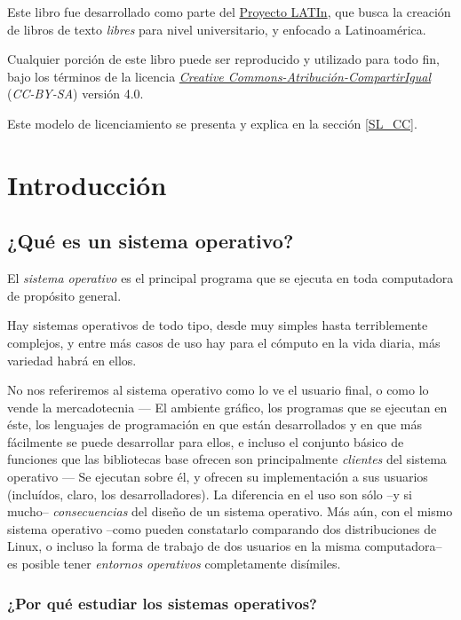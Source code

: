 \documentclass[11pt,fleqn]{book} %
\begin{document}
Este libro fue desarrollado como parte del \href{http://www.latinproject.org/}{Proyecto LATIn}, que busca
la creación de libros de texto \emph{libres} para nivel universitario, y
enfocado a Latinoamérica.

Cualquier porción de este libro puede ser reproducido y utilizado para
todo fin, bajo los términos de la licencia \emph{\href{https://creativecommons.org/licenses/by-sa/4.0/deed.es}{Creative Commons-Atribución-CompartirIgual}} (\emph{CC-BY-SA}) versión 4.0.

Este modelo de licenciamiento se presenta y explica en la sección
\ref{SL_CC}.


\chapter{Introducción}
\label{sec-1}
\section{¿Qué es un sistema operativo?}
\label{sec-1-1}
\label{INTRO}


El \emph{sistema operativo} es el principal programa que se ejecuta en toda
computadora de propósito general.

Hay sistemas operativos de todo tipo, desde muy simples hasta
terriblemente complejos, y entre más casos de uso hay para el cómputo
en la vida diaria, más variedad habrá en ellos.

No nos referiremos al sistema operativo como lo ve el usuario final, o
como lo vende la mercadotecnia — El ambiente gráfico, los programas
que se ejecutan en éste, los lenguajes de programación en que están 
desarrollados y en que más fácilmente se puede desarrollar para ellos, 
e incluso el conjunto básico de funciones que las bibliotecas base ofrecen son
principalmente \emph{clientes} del sistema operativo — Se ejecutan sobre él, y
ofrecen su implementación a sus usuarios (incluídos, claro, los
desarrolladores). La diferencia en el uso son sólo –y si mucho–
\emph{consecuencias} del diseño de un sistema operativo. Más aún, con el
mismo sistema operativo –como pueden constatarlo comparando dos
distribuciones de Linux, o incluso la forma de trabajo de dos usuarios
en la misma computadora– es posible tener \emph{entornos operativos}
completamente disímiles.
\subsection{¿Por qué estudiar los sistemas operativos?}
\label{sec-1-1-1}
\end{document}
